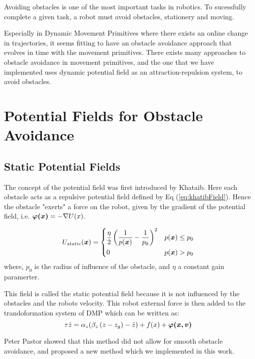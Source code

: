 Avoiding obstacles is one of the most important tasks in robotics. To sucessfully complete 
a given task, a robot must avoid obstacles, stationery and moving.

Especially in Dynamic Movement Primitives where there exists an online change in trajectories, it seems fitting
to have an obstacle avoidance approach that evolves in time with the movement primitives. 
There exists many approaches to obstacle avoidance in movement primitives, and the one that we have implemented uses
dynamic potential field as an attraction-repulsion system, to avoid obstacles.

\section{Potential Fields for Obstacle Avoidance}
\subsection{Static Potential Fields}
The concept of the potential field was first introduced by Khataib. Here each obstacle acts as a repulsive potential field 
defined by Eq (\ref{eq:khatibField}). Hence the obstacle "exerts" a force on the robot, given by the gradient of the potential field,
i.e. $\boldsymbol{\varphi(x)} = -\nabla U(x)$.

\begin{equation}
    \label{eq:khatibField}
    U_{static}(\boldsymbol{x}) = 
    \begin{dcases}
        \frac{\displaystyle \eta}{\displaystyle 2} \left( \frac{\displaystyle 1}{\displaystyle p(\boldsymbol{x})} - \frac{\displaystyle 1}{\displaystyle p_0}\right)^2 & p(\boldsymbol{x}) \leq p_0 \\
        0 & p(\boldsymbol{x}) > p_0
    \end{dcases}
\end{equation}
where, $p_0$ is the radius of influence of the obstacle, and $\eta$ a constant gain paramerter.

This field is called the static potential field because it is not influenced by the obstacles and the robots velocity.
This robot external force is then added to the trandoformation system of DMP which can be written as:
\begin{equation}
    \tau \dot{z} = \alpha_z (\beta_z \left( z - z_g \right) - \dot{z}) + f(x) + \boldsymbol{\varphi(x,v)}
\end{equation}

Peter Pastor showed that this method did not allow for smooth obstacle avoidance, and proposed a new method
which we implemented in this work.

